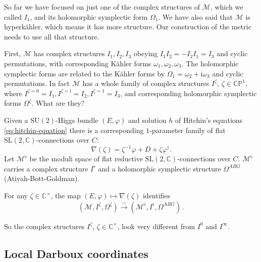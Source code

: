 \documentclass[12pt,letterpaper,reqno]{article}
\numberwithin{equation}{section}
\newcommand{\cM}{\ensuremath{\mathcal M}}
\newcommand{\bbC}{\ensuremath{\mathbb C}}
\newcommand{\bbP}{\ensuremath{\mathbb P}}
\newcommand{\kahler}{K\"ahler\xspace}
\newcommand{\hk}{hyperk\"ahler\xspace}
\newcommand{\I}{{\mathrm i}}
\newcommand{\simarrow}{\xrightarrow\sim}
\newcommand{\SL}{\mathrm{SL}}
\newcommand{\SU}{\mathrm{SU}}
\begin{document}
So far we have focused on just one of the complex
structures of $\cM$, which we called $I_1$,
and its holomorphic symplectic form $\Omega_1$.
We have also said that $\cM$ is \hk, which means it has more structure.
Our construction of the metric needs to use all that structure.

First, $\cM$ has complex structures $I_1, I_2, I_3$ obeying
$I_1 I_2 = -I_2 I_1 = I_3$ and cyclic permutations,
with corresponding \kahler forms $\omega_1, \omega_2, \omega_3$.
The holomorphic symplectic forms are related to the
\kahler forms by $\Omega_1 = \omega_2 + \I \omega_3$ 
and cyclic permutations.
In fact $\cM$ has a whole family of complex structures 
$I^\zeta$, $\zeta \in \bbC\bbP^1$, where
$I^{\zeta=0} = I_1, I^{\zeta = \I} = I_2, I^{\zeta = 1} = I_3$,
and corresponding holomorphic symplectic forms $\Omega^\zeta$.
What are they?

Given a $\SU(2)$-Higgs bundle $(E,\varphi)$ and 
solution $h$ of Hitchin's equations \eqref{eq:hitchin-equation}
there is a corresponding $1$-parameter family of flat
$\SL(2,\bbC)$-connections over $C$:
\begin{equation}
  \nabla(\zeta) = \zeta^{-1} \varphi + D + \zeta \varphi^\dagger.
\end{equation}
Let $\cM^\flat$
be the moduli space of flat reductive 
$\SL(2,\bbC)$-connections over $C$. 
$\cM^\flat$ carries a complex structure $I^\flat$
and a holomorphic symplectic
structure $\Omega^{ABG}$ (Atiyah-Bott-Goldman).

\begin{prop} \label{prop:generic-structures-flat-connections} For any $\zeta \in \bbC^\times$,
the map $(E,\varphi) \mapsto \nabla(\zeta)$ identifies
\begin{equation}
  (\cM, I^\zeta, \Omega^\zeta) \simarrow (\cM^\flat, I^\flat, \Omega^{ABG}) \, .
\end{equation}
\end{prop}

So the complex structures $I^\zeta$, $\zeta \in \bbC^\times$, look very different
from $I^0$ and $I^\infty$.


\subsection{Local Darboux coordinates}
\end{document}
